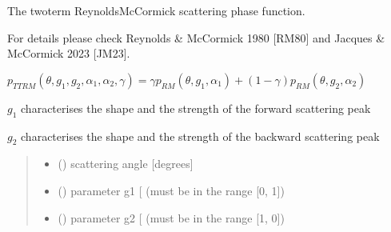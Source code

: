 \documentclass[letterpaper,10pt,english]{sphinxmanual}
\begin{document}
\begin{fulllineitems}
\label{\detokenize{06_anisotropy_factor:skinoptics.anisotropy_factor.ptheta_TTRM}}
\pysigstartsignatures
{}
\pysigstopsignatures
\begin{DUlineblock}{0em}
\item[] The two\sphinxhyphen{}term Reynolds\sphinxhyphen{}McCormick scattering phase function.
\item[] For details please check  Reynolds \& McCormick 1980 {[}RM80{]} and Jacques \& McCormick 2023 {[}JM23{]}.
\end{DUlineblock}

\sphinxAtStartPar
\(p_{TTRM}(\theta, g_1, g_2, \alpha_1, \alpha_2, \gamma) =  \gamma p_{RM}(\theta, g_1, \alpha_1) + (1 - \gamma) p_{RM}(\theta, g_2, \alpha_2)\)

\sphinxAtStartPar
\(g_1\) characterises the shape and the strength of the forward scattering peak

\sphinxAtStartPar
\(g_2\) characterises the shape and the strength of the backward scattering peak
\begin{quote}\begin{description}
\begin{itemize}
\item {} 
\sphinxAtStartPar
{} () \textendash{} scattering angle {[}degrees{]}

\item {} 
\sphinxAtStartPar
{} () \textendash{} parameter g1 {[}\sphinxhyphen{}{]} (must be in the range {[}0, 1{]})

\item {} 
\sphinxAtStartPar
{} () \textendash{} parameter g2 {[}\sphinxhyphen{}{]} (must be in the range {[}\sphinxhyphen{}1, 0{]})


\end{itemize}
\end{description}
\end{quote}
\end{fulllineitems}
\end{document}
